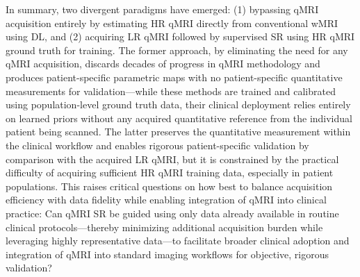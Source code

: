 \documentclass[journal,twoside,web]{ieeecolor}
\begin{document}
In summary, two divergent paradigms have emerged: (1) bypassing qMRI acquisition entirely by estimating HR qMRI directly from conventional wMRI using DL, and (2) acquiring LR qMRI followed by supervised SR using HR qMRI ground truth for training. The former approach, by eliminating the need for any qMRI acquisition, discards decades of progress in qMRI methodology and produces patient-specific parametric maps with no patient-specific quantitative measurements for validation---while these methods are trained and calibrated using population-level ground truth data, their clinical deployment relies entirely on learned priors without any acquired quantitative reference from the individual patient being scanned. The latter preserves the quantitative measurement within the clinical workflow and enables rigorous patient-specific validation by comparison with the acquired LR qMRI, but it is constrained by the practical difficulty of acquiring sufficient HR qMRI training data, especially in patient populations. This raises critical questions on how best to balance acquisition efficiency with data fidelity while enabling integration of qMRI into clinical practice: Can qMRI SR be guided using only data already available in routine clinical protocols---thereby minimizing additional acquisition burden while leveraging highly representative data---to facilitate broader clinical adoption and integration of qMRI into standard imaging workflows for objective, rigorous validation?
\end{document}
